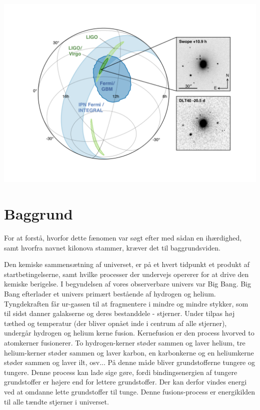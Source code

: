 \documentclass[twocolumn]{article}
\begin{document}
\begin{center}
\includegraphics[width=\columnwidth]{GW170817_MMA_Skymap} \label{fig1}
\end{center}





\section{Baggrund}\label{bag}

For at forstå, hvorfor dette fænomen var søgt efter med sådan en ihærdighed, samt hvorfra navnet kilonova stammer, kræver det til baggrundsviden. 

Den kemiske sammensætning af universet, er på et hvert tidpunkt et produkt af startbetingelserne, samt hvilke processer der undervejs opererer for at drive den kemiske berigelse. I begyndelsen af vores observerbare univers var Big Bang. Big Bang efterlader et univers primært bestående af hydrogen og helium. Tyngdekraften får ur-gassen til at fragmentere i mindre og mindre stykker, som til sidst danner galakserne og deres bestanddele - stjerner. Under tilpas høj tæthed og temperatur (der bliver opnået inde i centrum af alle stjerner), undergår hydrogen og helium kerne fusion. Kernefusion er den process hvorved to atomkerner fusionerer. To hydrogen-kerner støder sammen og laver helium, tre helium-kerner støder sammen og laver karbon, en karbonkerne og en heliumkerne støder sammen og laver ilt, osv... På denne måde bliver grundstofferne tungere og tungere. Denne process kan lade sige gøre, fordi bindingsenergien af tungere grundstoffer er højere end for lettere grundstoffer. Der kan derfor vindes energi ved at omdanne lette grundstoffer til tunge. Denne fusions-process er energikilden til alle tændte stjerner i universet. 
\end{document}
